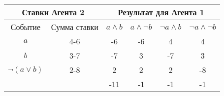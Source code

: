 \documentclass[A4,11pt]{article}
\begin{document}
\thispagestyle{empty}

\begin{tabular}{cccccc}
\multicolumn{2}{c}{Ставки Агента 2}  &  \multicolumn{4}{c}{Результат для Агента 1} \\
\hline
{\tiny Событие} & {\tiny Сумма ставки} & {\tiny $a\wedge b$} & {\tiny $a\wedge \neg b$} &  {\tiny $\neg a\wedge b$} &  {\tiny $\neg a\wedge\neg b$} \\
\hline
$a$             & 4-6 & -6 & -6 &  4 &  4 \\
$b$             & 3-7 & -7 &  3 & -7 &  3 \\
$\neg(a\vee b)$ & 2-8 &  2 &  2 &  2 & -8 \\
\hline
                &     &-11 & -1 & -1 & -1
\end{tabular}
\end{document}
